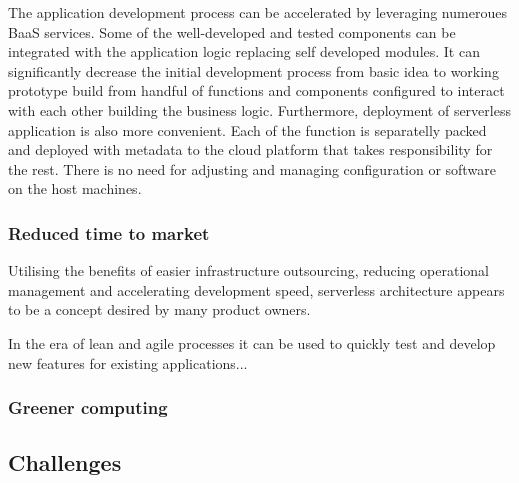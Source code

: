 The application development process can be accelerated by leveraging numeroues BaaS services. Some of the well-developed and tested components can be integrated with the application logic replacing self developed modules. 
It can significantly decrease the initial development process from basic idea to working prototype build from handful of functions and components configured to interact with each other building the business logic. 
Furthermore, deployment of serverless application is also more convenient. Each of the function is separatelly packed and deployed with metadata to the cloud platform that takes responsibility for the rest. There is no need for adjusting and managing configuration or software on the host machines.

\subsubsection*{Reduced time to market}

Utilising the benefits of easier infrastructure outsourcing, reducing operational management and accelerating development speed, serverless architecture appears to be a concept desired by many product owners. 

In the era of lean and agile processes it can be used to quickly test and develop new features for existing applications... %


\subsubsection*{Greener computing}


\subsection{Challenges}




